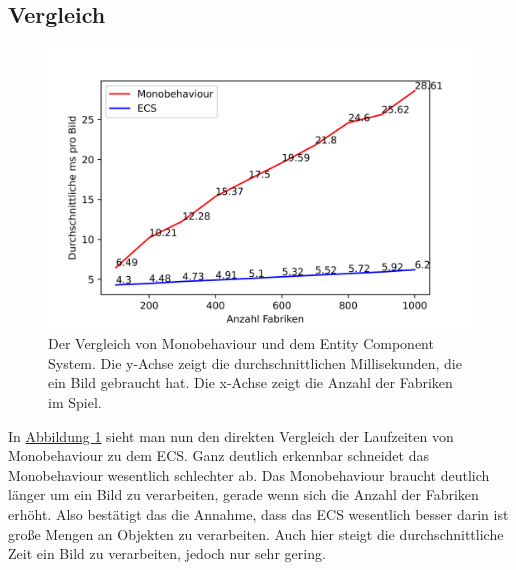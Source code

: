 \subsection{Vergleich}
\begin{figure}[H]
\centering
\includegraphics[scale=1]{Bilder/Benchmark.png}
\caption{Der Vergleich von Monobehaviour und dem Entity Component System. Die y-Achse zeigt die durchschnittlichen Millisekunden, die ein Bild gebraucht hat. Die x-Achse zeigt die Anzahl der Fabriken im Spiel.}
\label{fig:benchmark}
\end{figure}
In \hyperref[fig:benchmark]{Abbildung \ref*{fig:benchmark}} sieht man nun den direkten Vergleich der Laufzeiten von Monobehaviour zu dem ECS. Ganz deutlich erkennbar schneidet das Monobehaviour wesentlich schlechter ab. Das Monobehaviour braucht deutlich länger um ein Bild zu verarbeiten, gerade wenn sich die Anzahl der Fabriken erhöht. Also bestätigt das die Annahme, dass das ECS wesentlich besser darin ist große Mengen an Objekten zu verarbeiten. Auch hier steigt die durchschnittliche Zeit ein Bild zu verarbeiten, jedoch nur sehr gering. 